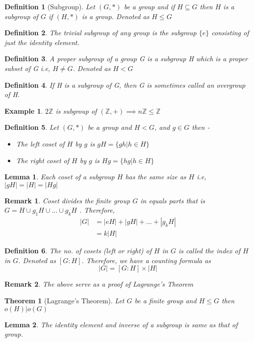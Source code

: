 \documentclass[12pt,a4paper]{article}
\newcommand{\Z}{\mathbb{Z}}
\newtheorem{thm}{Theorem}
\newtheorem*{defn}{Definition}
\newtheorem*{rem}{Remark}
\newtheorem*{lem}{Lemma}
\newtheorem{ex}{Example}
\begin{document}
\begin{defn}[Subgroup]\normalfont
	Let $(G,*)$ be a group and if $H \subseteq G$ then $H$ is a subgroup of $G$ if $(H,*)$ is a group. Denoted as $H \le G$
\end{defn}
\begin{defn}\normalfont
	The trivial subgroup of any group is the subgroup $\{e\}$ consisting of just the identity element.
\end{defn}
\begin{defn}\normalfont
	A proper subgroup of a group G is a subgroup H which is a proper subset of G i.e, $H \ne G$. Denoted as $H < G$
\end{defn}
\begin{defn}\normalfont
	If H is a subgroup of G, then G is sometimes called an overgroup of H.
\end{defn}
\begin{ex}
	$2\Z$ is subgroup of $(\Z, +) \implies n\Z \le \Z$
\end{ex}

\begin{defn}\normalfont
	Let $(G,*)$ be a group and $H<G$, and $g \in G$ then -
	\begin{itemize}
		\item The left coset of $H$ by $g$ is $gH = \{gh | h \in H\}$
		\item The right coset of $H$ by $g$ is $Hg = \{hg | h \in H\}$
	\end{itemize}
\end{defn}
\begin{lem}\normalfont
	Each coset of a subgroup $H$ has the same size as $H$ i.e, $|gH|=|H|=|Hg|$
\end{lem}

\begin{rem}
Coset divides the finite group $G$ in equals parts that is $G = H \cup g_{1}H \cup \dots \cup g_{k}H$ . Therefore,
\begin{align*}
		|G| &= |eH| + |gH| + \dots + |g_{k}H| \\
			&= k|H|
\end{align*}
\end{rem}

\begin{defn}\normalfont
	The no. of cosets (left or right) of $H$ in $G$ is called the index of $H$ in $G$. Denoted as $[G:H]$. Therefore, we have a counting formula as $$
		|G| = [G:H] \times |H|
	$$
\end{defn}
\begin{rem}
	The above serve as a proof of Lagrange's Theorem
\end{rem}
\begin{thm}[Lagrange's Theorem]
	Let $G$ be a finite group and $H \le G$ then $o(H)|o(G)$
\end{thm}
\begin{lem}\normalfont
	The identity element and inverse of a subgroup is same as that of group.
\end{lem}
\end{document}
